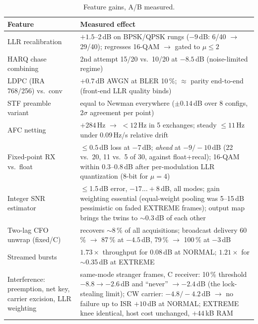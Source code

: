 \begin{table}[H]
    \centering
    \caption{Feature gains, A/B measured.}
    \label{tab:gains}
    \small
    \begin{tabular}{@{}p{4.6cm}p{9.6cm}@{}}
    \toprule
    \textbf{Feature} & \textbf{Measured effect} \\
    \midrule
    LLR recalibration & $+1.5$--2\,dB on BPSK/QPSK rungs ($-9$\,dB:
        6/40 $\to$ 29/40); regresses 16-QAM $\to$ gated to
        $\mu \le 2$ \\
    HARQ chase combining & 2nd attempt 15/20 vs.\ 10/20 at
        $-8.5$\,dB (noise-limited regime) \\
    LDPC (IRA 768/256) vs.\ conv & $+0.7$\,dB AWGN at BLER 10\,\%;
        $\approx$ parity end-to-end (front-end LLR quality binds) \\
    STF preamble variant & equal to Newman everywhere ($\pm 0.14$\,dB
        over 8 configs, $2\sigma$ agreement per point) \\
    AFC netting & $+284$\,Hz $\to$ $<12$\,Hz in 5 exchanges; steady
        $\le 11$\,Hz under 0.09\,Hz/s relative drift \\
    Fixed-point RX vs.\ float & $\le 0.5$\,dB loss at $-7$\,dB;
        \emph{ahead} at $-9/-10$\,dB (22 vs.\ 20, 11 vs.\ 5 of 30,
        against float+recal); 16-QAM within 0.3--0.8\,dB after
        per-modulation LLR quantization (8-bit for $\mu = 4$) \\
    Integer SNR estimator & $\le$1.5\,dB error, $-17\ldots+8$\,dB, all
        modes; gain weighting essential (equal-weight pooling was
        5--15\,dB pessimistic on faded EXTREME frames); output map
        brings the twins to $\sim$0.3\,dB of each other \\
    Two-lag CFO unwrap (fixed/C) & recovers $\sim$8\,\% of all
        acquisitions; broadcast delivery 60\,\% $\to$ 87\,\% at
        $-4.5$\,dB, 79\,\% $\to$ 100\,\% at $-3$\,dB \\
    Streamed bursts & $1.73\times$ throughput for 0.08\,dB at NORMAL;
        $1.21\times$ for $\sim$0.35\,dB at EXTREME \\
    Interference: preemption, net key, carrier excision, LLR
        weighting & same-mode stranger frames, C receiver: 10\,\%
        threshold $-8.8 \to -2.6$\,dB and ``never'' $\to -2.4$\,dB (the
        lock-stealing limit); CW carrier: $-4.8 / -4.2$\,dB $\to$ no
        failure up to ISR $+10$\,dB at NORMAL; EXTREME knee identical,
        host cost unchanged, $+44$\,kB RAM \\

\end{tabular}
\end{table}
